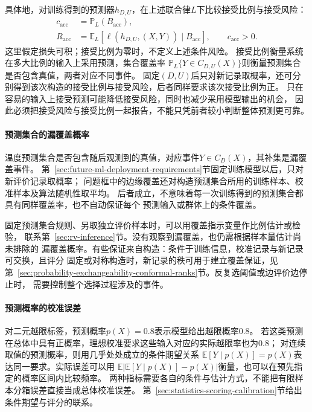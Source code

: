 具体地，对训练得到的预测器$h_{D,U}$，在上述联合律$L$下比较接受比例与接受风险：
\[
  \begin{aligned}
    c_{\mathrm{acc}}&=\mathbb P_L(B_{\mathrm{acc}}),\\
    R_{\mathrm{acc}}&=\mathbb E_L\!\left[
      \ell(h_{D,U},(X,Y))\mid B_{\mathrm{acc}}
    \right],\qquad c_{\mathrm{acc}}>0.
  \end{aligned}
\]
这里假定损失可积；接受比例为零时，不定义上述条件风险。
接受比例衡量系统在多大比例的输入上采用预测，集合覆盖率
$\mathbb P_L\{Y\in C_{D,U}(X)\}$则衡量预测集合是否包含真值，两者对应不同事件。
固定$(D,U)$后只对新记录取概率，还可分别得到该次构造的接受比例与接受风险，后者同样要求该次接受比例为正。
只在容易的输入上接受预测可能降低接受风险，同时也减少采用模型输出的机会，
因此必须把接受风险与接受比例一起报告，不能只凭前者较小判断整体预测更可靠。

\paragraph{预测集合的漏覆盖概率}

温度预测集合是否包含随后观测到的真值，对应事件$Y\in C_D(X)$，其补集是漏覆盖事件。
第~\ref{sec:future-ml-deployment-requirements}节固定训练模型以后，只对新评价记录取概率；
问题框中的边缘覆盖还对构造预测集合所用的训练样本、校准样本及算法随机性取平均。
后者成立，不意味着每一次训练得到的预测集合都具有同样覆盖率，也不自动保证每个
预测输入或群体上的条件覆盖。

固定预测集合规则、另取独立评价样本时，可以用覆盖指示变量作比例估计或检验，
联系第~\ref{sec:rv-inference}节。没有观察到漏覆盖，也仍需根据样本量估计尚未排除的
漏覆盖概率。有些保证来自构造：条件于训练信息，校准记录与新记录可交换，且评分
固定或对称构造时，新记录的秩可用于建立覆盖保证，见
第~\ref{sec:probability-exchangeability-conformal-ranks}节。反复选阈值或边评价边停止时，
需要控制整个选择过程涉及的事件。

\paragraph{预测概率的校准误差}

对二元越限标签，预测概率$p(X)=0.8$表示模型给出越限概率$0.8$。
若这类预测在总体中具有正概率，理想校准要求这些输入对应的实际越限率也为$0.8$；
对连续取值的预测概率，则用几乎处处成立的条件期望关系
$\mathbb E[Y\mid p(X)]=p(X)$表达同一要求。实际误差可以用
$\mathbb E|\mathbb E[Y\mid p(X)]-p(X)|$衡量，也可以在预先指定的概率区间内比较频率。
两种指标需要各自的条件与估计方式，不能把有限样本分箱误差直接当成总体校准误差。
第~\ref{sec:statistics-scoring-calibration}节给出条件期望与评分的联系。

